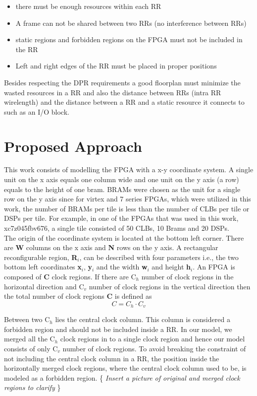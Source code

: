 \documentclass[conference]{IEEEtran}
\begin{document}
\begin{itemize}
\item there must be enough resources within each RR
\item A frame can not be shared between two RRs (no interference between RRs)
\item static regions and forbidden regions on the FPGA must not be included in the RR 
\item Left and right edges of the RR must be placed in proper positions
\end{itemize}

Besides respecting the DPR requirements a good floorplan must minimize the wasted resources in a RR and also the distance between RRs (intra RR wirelength) and the distance between a RR and a static resource it connects to such as an I/O block.

\section{Proposed Approach} 
This work consists of modelling the FPGA with a x-y coordinate system. A single unit on the x axis equals one column wide and one unit on the y axis (a row) equals to the height of one bram. BRAMs were chosen as the unit for a single row on the y axis since for virtex and 7 series FPGAs, which were utilized in this work, the number of BRAMs per tile is less than the number of CLBs per tile or DSPs per tile. For example, in one of the FPGAs that was used in this work, xc7z045fbv676, a single tile consisted of 50 CLBs, 10 Brams and 20 DSPs. \\ 
The origin of the coordinate system is located at the bottom left corner. There are \textbf{W} columns on the x axis and \textbf{N} rows on the y axis. A rectangular reconfigurable region, \textbf{R}$_i$, can be described with four parameters i.e., the two bottom left coordinates \textbf{x}$_i$, \textbf{y}$_i$ and the width \textbf{w}$_i$ and height \textbf{h}$_i$. An FPGA is composed of \textbf{C} clock regions. If there are C$_h$ number of clock regions in the horizontal direction and C$_v$ number of clock regions in the vertical direction then the total number of clock regions \textbf{C} is defined as
\begin{equation}
C = C_h \cdot C_v
\end{equation}

Between two C$_h$ lies the central clock column. This column is considered a forbidden region and should not be included inside a RR. In our model, we merged all the C$_h$ clock regions in to a single clock region and hence our model consists of only C$_v$ number of clock regions. To avoid breaking the constraint of not including the central clock column in a RR, the position inside the horizontally merged clock regions, where the central clock column used to be, is modeled as a forbidden region. \{\textit{ \color{red} Insert a picture of original and merged clock regions to clarify} \}
\end{document}
